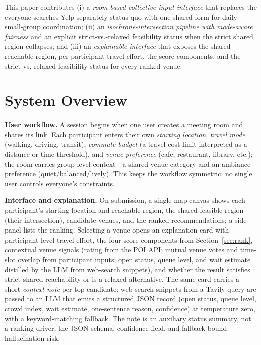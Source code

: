 \documentclass[sigconf]{acmart}
\begin{document}
This paper contributes (i) a \emph{room-based collective input interface} that replaces the everyone-searches-Yelp-separately status quo with one shared form for daily small-group coordination; (ii) an \emph{isochrone-intersection pipeline with mode-aware fairness} and an explicit strict-vs.-relaxed feasibility status when the strict shared region collapses; and (iii) an \emph{explainable interface} that exposes the shared reachable region, per-participant travel effort, the score components, and the strict-vs.-relaxed feasibility status for every ranked venue.



\section{System Overview}
\label{sec:overview}

\noindent\textbf{User workflow.} A session begins when one user creates a meeting room and shares its link. Each participant enters their own \emph{starting location}, \emph{travel mode} (walking, driving, transit), \emph{commute budget} (a travel-cost limit interpreted as a distance or time threshold), and \emph{venue preference} (cafe, restaurant, library, etc.); the room carries group-level context---a shared venue category and an ambiance preference (quiet/balanced/lively). This keeps the workflow symmetric: no single user controls everyone's constraints.

\noindent\textbf{Interface and explanation.} On submission, a single map canvas shows each participant's starting location and reachable region, the shared feasible region (their intersection), candidate venues, and the ranked recommendations; a side panel lists the ranking. Selecting a venue opens an explanation card with participant-level travel effort, the four score components from Section~\ref{sec:rank}, contextual venue signals (rating from the POI API; mutual venue votes and time-slot overlap from participant inputs; open status, queue level, and wait estimate distilled by the LLM from web-search snippets), and whether the result satisfies strict shared reachability or is a relaxed alternative. The same card carries a short \emph{context note} per top candidate: web-search snippets from a Tavily query are passed to an LLM that emits a structured JSON record (open status, queue level, crowd index, wait estimate, one-sentence reason, confidence) at temperature zero, with a keyword-matching fallback. The note is an auxiliary status summary, not a ranking driver; the JSON schema, confidence field, and fallback bound hallucination risk.
\end{document}
